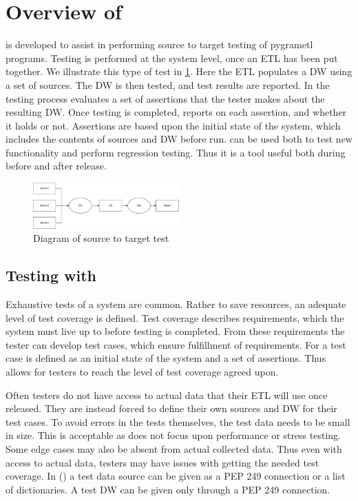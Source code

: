 \section{Overview of \FW{}}
\FW{} is developed to assist in performing source to target testing of pygrametl programs. Testing is performed at the system level, once an ETL has been put together. We illustrate this type of test in \ref{fig:sourcetotarget}. Here the ETL populates a DW using a set of sources. The DW is then tested, and test results are reported. In \FW{} the testing process evaluates a set of assertions that the tester makes about the resulting DW. Once testing is completed, \FW{} reports on each assertion, and whether it holds or not. Assertions are based upon the initial state of the system, which includes the contents of sources and DW before run. \FW{} can be used both to test new functionality and perform regression testing. Thus it is a tool useful both during before and after release. 

\begin{figure}
\centering
\includegraphics[width=0.5\textwidth]{figures/scenario.pdf}
\caption{Diagram of source to target test}
\label{fig:sourcetotarget}
\end{figure}

\subsection{Testing with \FW{}}
Exhaustive tests of a system are common. Rather to save resources, an adequate level of test coverage is defined. Test coverage describes requirements, which the system must live up to before testing is completed. From these requirements the tester can develop test cases, which ensure fulfillment of requirements. For \FW{} a test case is defined as an initial state of the system and a set of assertions. Thus \FW{} allows for testers to reach the level of test coverage agreed upon.

Often testers do not have access to actual data that their ETL will use once released. They are instead forced to define their own sources and DW  for their test cases. To avoid errors in the tests themselves, the test data needs to be small in size. This is acceptable as \FW{} does not focus upon  performance or stress testing. Some edge cases may also be absent from actual collected data. Thus even with access to actual data, testers may have issues with getting the needed test coverage. In \FW() a test data source can be given as a  PEP 249 connection or a list of dictionaries. A test DW can be given only through a PEP 249 connection. 

